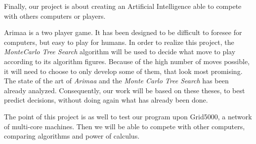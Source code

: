 
Finally, our project is about creating an Artificial Intelligence able to compete with others computers or players.
\newline

Arimaa is a two player game. It has been designed to be difficult to foresee for computers, but easy to play for humans. 
In order to realize this project, the \emph{MonteCarlo Tree Search} algorithm will be used to decide what move to play according to its algorithm figures. Because of the high number of moves possible, it will need to choose to only develop some of them, that look most promising.
The state of the art of \emph{Arimaa} and the \emph{Monte Carlo Tree Search} has been already analyzed. Consequently, our work will be based on these theses, to best predict decisions, without doing again what has already been done.
\newline

The point of this project is as well to test our program upon Grid5000, a network of multi-core machines. Then we will be able to compete with other computers, comparing algorithms and power of calculus.